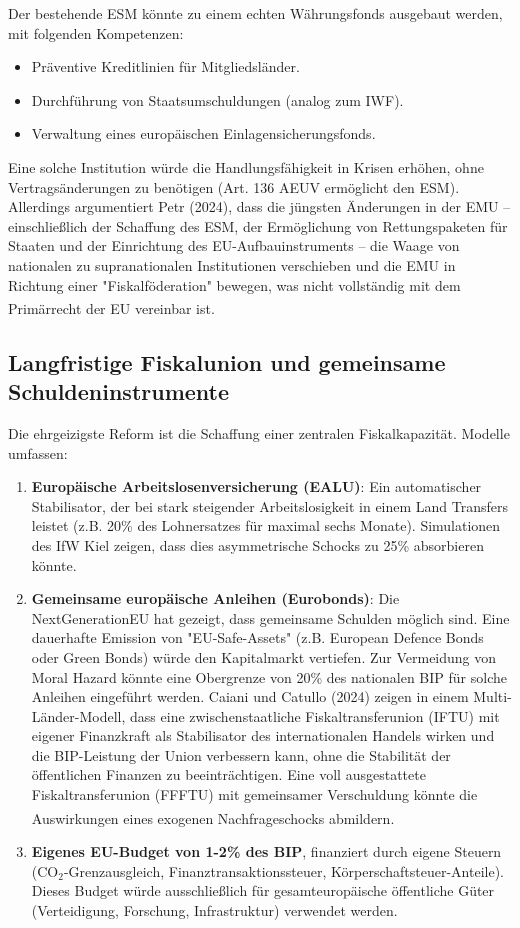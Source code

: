 \documentclass[12pt,a4paper]{article}
\newcommand{\footcite}[1]{\textsuperscript{\cite{#1}}}
\begin{document}
	Der bestehende ESM könnte zu einem echten Währungsfonds ausgebaut werden, mit folgenden Kompetenzen:
	\begin{itemize}
		\item Präventive Kreditlinien für Mitgliedsländer.
		\item Durchführung von Staatsumschuldungen (analog zum IWF).
		\item Verwaltung eines europäischen Einlagensicherungsfonds.
	\end{itemize}
	Eine solche Institution würde die Handlungsfähigkeit in Krisen erhöhen, ohne Vertragsänderungen zu benötigen (Art. 136 AEUV ermöglicht den ESM). Allerdings argumentiert Petr (2024), dass die jüngsten Änderungen in der EMU – einschließlich der Schaffung des ESM, der Ermöglichung von Rettungspaketen für Staaten und der Einrichtung des EU-Aufbauinstruments – die Waage von nationalen zu supranationalen Institutionen verschieben und die EMU in Richtung einer "Fiskalföderation" bewegen, was nicht vollständig mit dem Primärrecht der EU vereinbar ist.\footcite{Petr2024}
	
	\subsection{Langfristige Fiskalunion und gemeinsame Schuldeninstrumente}
	
	Die ehrgeizigste Reform ist die Schaffung einer zentralen Fiskalkapazität. Modelle umfassen:
	
	\begin{enumerate}
		\item \textbf{Europäische Arbeitslosenversicherung (EALU)}: Ein automatischer Stabilisator, der bei stark steigender Arbeitslosigkeit in einem Land Transfers leistet (z.B. 20\% des Lohnersatzes für maximal sechs Monate). Simulationen des IfW Kiel zeigen, dass dies asymmetrische Schocks zu 25\% absorbieren könnte.
		
		\item \textbf{Gemeinsame europäische Anleihen (Eurobonds)}: Die NextGenerationEU hat gezeigt, dass gemeinsame Schulden möglich sind. Eine dauerhafte Emission von "EU-Safe-Assets" (z.B. European Defence Bonds oder Green Bonds) würde den Kapitalmarkt vertiefen. Zur Vermeidung von Moral Hazard könnte eine Obergrenze von 20\% des nationalen BIP für solche Anleihen eingeführt werden. Caiani und Catullo (2024) zeigen in einem Multi-Länder-Modell, dass eine zwischenstaatliche Fiskaltransferunion (IFTU) mit eigener Finanzkraft als Stabilisator des internationalen Handels wirken und die BIP-Leistung der Union verbessern kann, ohne die Stabilität der öffentlichen Finanzen zu beeinträchtigen. Eine voll ausgestattete Fiskaltransferunion (FFFTU) mit gemeinsamer Verschuldung könnte die Auswirkungen eines exogenen Nachfrageschocks abmildern.\footcite{Caiani2024}
		
		\item \textbf{Eigenes EU-Budget von 1-2\% des BIP}, finanziert durch eigene Steuern (CO$_2$-Grenzausgleich, Finanztransaktionssteuer, Körperschaftsteuer-Anteile). Dieses Budget würde ausschließlich für gesamteuropäische öffentliche Güter (Verteidigung, Forschung, Infrastruktur) verwendet werden.
	\end{enumerate}
	
\end{document}
